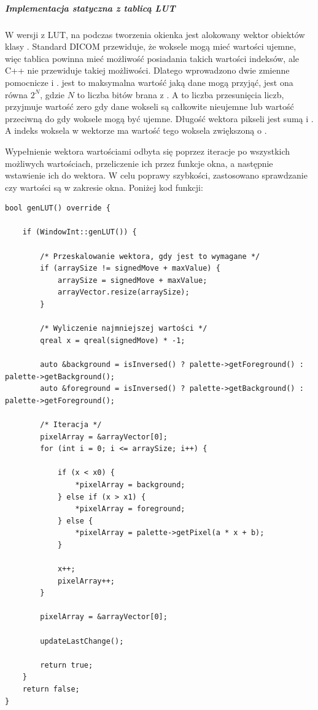 \subparagraph{Implementacja statyczna z tablicą LUT}
\par
W wersji z LUT, na podczas tworzenia okienka jest alokowany wektor obiektów  klasy .
Standard DICOM przewiduje, że woksele mogą mieć wartości ujemne, więc tablica powinna mieć możliwość posiadania takich wartości indeksów, ale C++ nie przewiduje takiej możliwości.
Dlatego wprowadzono dwie zmienne pomocnicze  i .
 jest to maksymalna wartość jaką dane mogą przyjąć, jest ona równa $2^N$, gdzie $N$ to liczba bitów brana z .
A  to liczba przesunięcia liczb, przyjmuje wartość zero gdy dane wokseli są całkowite nieujemne lub wartość przeciwną do  gdy woksele mogą być ujemne.
Długość wektora pikseli jest sumą  i .
A indeks woksela w wektorze ma wartość tego woksela zwiększoną o .
\par
Wypełnienie wektora wartościami odbyta się poprzez iteracje po wszystkich możliwych wartościach, przeliczenie ich przez funkcje okna, a następnie wstawienie ich do wektora.
W celu poprawy szybkości, zastosowano sprawdzanie czy wartości są w zakresie okna.
Poniżej kod funkcji:
\begin{lstlisting}
bool genLUT() override {

    if (WindowInt::genLUT()) {

        /* Przeskalowanie wektora, gdy jest to wymagane */
        if (arraySize != signedMove + maxValue) {
            arraySize = signedMove + maxValue;
            arrayVector.resize(arraySize);
        }

        /* Wyliczenie najmniejszej wartości */
        qreal x = qreal(signedMove) * -1;

        auto &background = isInversed() ? palette->getForeground() : palette->getBackground();
        auto &foreground = isInversed() ? palette->getBackground() : palette->getForeground();

        /* Iteracja */
        pixelArray = &arrayVector[0];
        for (int i = 0; i <= arraySize; i++) {

            if (x < x0) {
                *pixelArray = background;
            } else if (x > x1) {
                *pixelArray = foreground;
            } else {
                *pixelArray = palette->getPixel(a * x + b);
            }

            x++;
            pixelArray++;
        }

        pixelArray = &arrayVector[0];

        updateLastChange();

        return true;
    }
    return false;
}
\end{lstlisting}

